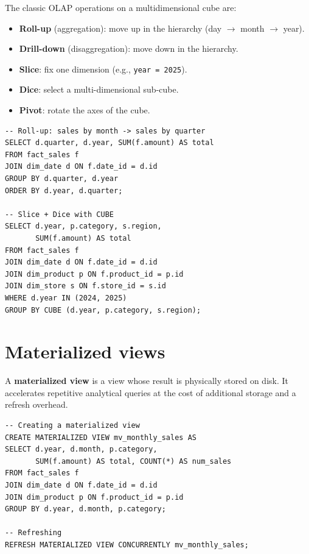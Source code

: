 \begin{definition}
The classic OLAP operations on a multidimensional cube are:
\begin{itemize}
  \item \textbf{Roll-up} (aggregation): move up in the hierarchy
        (day $\to$ month $\to$ year).
  \item \textbf{Drill-down} (disaggregation): move down in the hierarchy.
  \item \textbf{Slice}: fix one dimension (e.g., \texttt{year = 2025}).
  \item \textbf{Dice}: select a multi-dimensional sub-cube.
  \item \textbf{Pivot}: rotate the axes of the cube.
\end{itemize}
\end{definition}

\begin{verbatim}
-- Roll-up: sales by month -> sales by quarter
SELECT d.quarter, d.year, SUM(f.amount) AS total
FROM fact_sales f
JOIN dim_date d ON f.date_id = d.id
GROUP BY d.quarter, d.year
ORDER BY d.year, d.quarter;

-- Slice + Dice with CUBE
SELECT d.year, p.category, s.region,
       SUM(f.amount) AS total
FROM fact_sales f
JOIN dim_date d ON f.date_id = d.id
JOIN dim_product p ON f.product_id = p.id
JOIN dim_store s ON f.store_id = s.id
WHERE d.year IN (2024, 2025)
GROUP BY CUBE (d.year, p.category, s.region);
\end{verbatim}

\section{Materialized views}

\begin{definition}
A \textbf{materialized view} is a view whose result is physically stored
on disk. It accelerates repetitive analytical queries at the cost of
additional storage and a refresh overhead.
\end{definition}

\begin{verbatim}
-- Creating a materialized view
CREATE MATERIALIZED VIEW mv_monthly_sales AS
SELECT d.year, d.month, p.category,
       SUM(f.amount) AS total, COUNT(*) AS num_sales
FROM fact_sales f
JOIN dim_date d ON f.date_id = d.id
JOIN dim_product p ON f.product_id = p.id
GROUP BY d.year, d.month, p.category;

-- Refreshing
REFRESH MATERIALIZED VIEW CONCURRENTLY mv_monthly_sales;
\end{verbatim}

